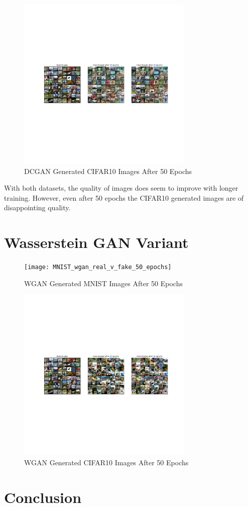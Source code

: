 \documentclass[letterpaper, 10pt]{article}
\begin{document}
\begin{figure}[h]
\caption{DCGAN Generated CIFAR10 Images After 50 Epochs}
\centering
\includegraphics[width=0.75\textwidth]{cifar10_gan_real_v_fake_50_epochs}
\end{figure}

With both datasets, the quality of images does seem to improve with longer training. However, even after 50 epochs the CIFAR10 generated 
images are of disappointing quality. 


\section{Wasserstein GAN Variant}

\begin{figure}[h]
\caption{WGAN Generated MNIST Images After 50 Epochs}
\centering
\texttt{[image: MNIST\_wgan\_real\_v\_fake\_50\_epochs]}
\end{figure}

\begin{figure}[h]
\caption{WGAN Generated CIFAR10 Images After 50 Epochs}
\centering
\includegraphics[width=0.75\textwidth]{cifar10_wgan_real_v_fake_50_epochs}
\end{figure}


\section{Conclusion}

\newpage


\end{document}
